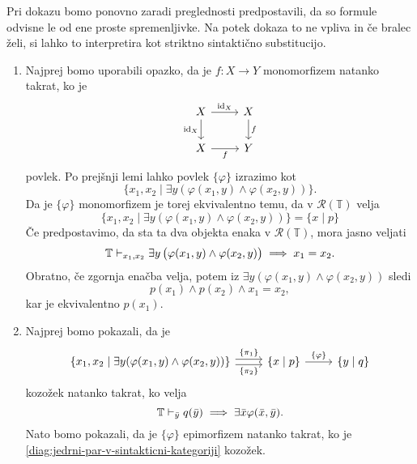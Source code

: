 \documentclass[../kategoricna_logika.tex]{subfiles}
\begin{document}
  \begin{dokaz}
    Pri dokazu bomo ponovno zaradi preglednosti predpostavili, da so
    formule odvisne le od ene proste spremenljivke. Na potek dokaza to
    ne vpliva in če bralec želi, si lahko to interpretira kot striktno
    sintaktično substitucijo.
    \begin{enumerate}[label=(\roman*)]
    \item Najprej bomo uporabili opazko, da je $f : X \to Y$
      monomorfizem natanko takrat, ko je
      \begin{equation*}
        \begin{tikzcd}
          X \ar[d, " \mathrm{id}_X"'] \ar[r, " \mathrm{id}_X"] & X \ar[d, "f"] \\
          X \ar[r, "f"'] & Y
        \end{tikzcd}
      \end{equation*}
      povlek. Po prejšnji lemi lahko povlek $\{\varphi\}$ izrazimo kot
      \[ \{ x_1,x_2 \mid \exists y(\varphi(x_1,y) \land
        \varphi(x_2,y)) \}.\] Da je $\{\varphi\}$ monomorfizem je
      torej ekvivalentno temu, da v $\mathcal{R}(\mathbb{T})$ velja
      \[ \{ x_1,x_2 \mid \exists y(\varphi(x_1,y) \land
        \varphi(x_2,y)) \} = \{x \mid p\} \] Če predpostavimo, da sta
      ta dva objekta enaka v $\mathcal{R}(\mathbb{T})$, mora jasno
      veljati
    $$\mathbb{T} \vdash_{x_1,x_2}  \exists y \left( \varphi(x_1,y) \wedge \varphi(x_2,y) \right) \implies x_1 = x_2 .$$
    Obratno, če zgornja enačba velja, potem iz
    $\exists y(\varphi(x_1,y) \land \varphi(x_2,y))$ sledi
    \[p(x_1) \land p(x_2) \land x_1 = x_2,\] kar je ekvivalentno
    $p(x_1)$.

  \item
    Najprej bomo pokazali, da je
    \begin{equation}\label{diag:jedrni-par-v-sintakticni-kategoriji}
      \begin{tikzcd}[column sep=normal]
        \{ x_1,x_2 \mid \exists y(\varphi(x_1,y) \land \varphi(x_2,y))
        \} \ar[r, shift left, "\{\pi_1\}"] \ar[r, shift right,
        "\{\pi_2\}"'] & \{x \mid p\} \ar[r, "\{\varphi\}"] & \{y \mid
        q\}
      \end{tikzcd}
    \end{equation}
    kozožek natanko takrat, ko velja
    $$\mathbb{T} \vdash_{\bar{y}} q(\bar{y}) \implies \exists \bar{x} \varphi(\bar{x},\bar{y}).$$
    Nato bomo pokazali, da je $\{ \varphi\}$ epimorfizem natanko takrat, ko
    je \eqref{diag:jedrni-par-v-sintakticni-kategoriji} kozožek.



\end{enumerate}
\end{dokaz}
\end{document}
